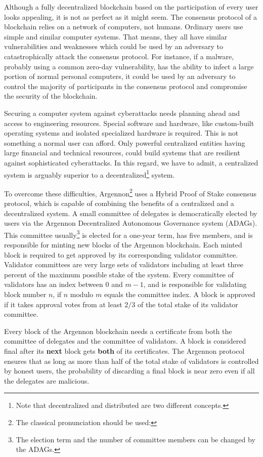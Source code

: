 Although a fully decentralized blockchain based on the participation of every user looks appealing, it is not as perfect
as it might seem. The consensus protocol of a blockchain relies on a network of computers, not humans. Ordinary users
use simple and similar computer systems. That means, they all have similar vulnerabilities and weaknesses which could be
used by an adversary to catastrophically attack the consensus protocol. For instance, if a malware, probably using a
common zero-day
vulnerability, has the ability to infect a large portion of normal personal computers, it could be used by an
adversary to control the majority of participants in the consensus protocol and compromise the security of the
blockchain.

Securing a computer system against cyberattacks needs planning ahead and access to engineering resources.
Special software and hardware, like custom-built operating systems and isolated specialized hardware is required.
This is not something a normal user can afford. Only powerful centralized entities having large financial and
technical resources, could build
systems that are resilient against sophisticated cyberattacks. In this regard, we have to admit, a centralized system is
arguably superior to a decentralized\footnote{Note that decentralized and distributed are two different concepts.}
system.

To overcome these difficulties, Argennon\footnote{The classical pronunciation should be used:}
uses a Hybrid Proof of Stake consensus protocol, which is
capable of combining the benefits of a centralized and a decentralized system. A small committee of
delegates is democratically elected by users via the Argennon Decentralized Autonomous Governance system
(ADAGs). This committee usually\footnote{The election term and the number of committee members can be changed by the
ADAGs.} is elected for a one-year term, has five members, and is responsible for minting new
blocks of the Argennon blockchain.
Each minted block is required to get approved by its corresponding validator committee.
Validator committees are very
large sets of validators including at least three percent of the maximum possible stake of the system.
Every committee of validators has an index between $0$ and $m - 1$, and is responsible for validating block number $n$,
if $n$ modulo $m$ equals the committee index. A block is approved if it takes approval votes from at least $2/3$ of
the total stake of its validator committee.

Every block of the Argennon blockchain needs a certificate from both the committee of delegates and
the committee of validators. A block is considered final after its \textbf{next} block gets \textbf{both} of
its certificates. The Argennon protocol ensures that as long as more than half of the total stake of validators is
controlled by honest users, the probability of discarding a final block is near zero even if all the delegates are
malicious.

